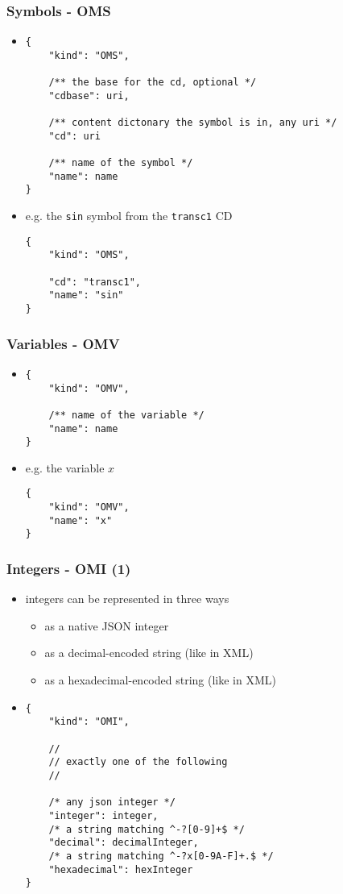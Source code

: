 \documentclass[usenames,dvipsnames]{beamer}
\begin{document}
\begin{frame}[fragile]
    \frametitle{Symbols - OMS}
    \begin{itemize}
        \item
\begin{lstlisting}
{
    "kind": "OMS",

    /** the base for the cd, optional */
    "cdbase": uri, 

    /** content dictonary the symbol is in, any uri */
    "cd": uri

    /** name of the symbol */
    "name": name
}
\end{lstlisting}
        \item e.g. the \texttt{sin} symbol from the \texttt{transc1} CD
\begin{lstlisting}
{
    "kind": "OMS",

    "cd": "transc1",
    "name": "sin"
}
\end{lstlisting}
    \end{itemize}
\end{frame}

\begin{frame}[fragile]
    \frametitle{Variables - OMV}
    \begin{itemize}
        \item
        \begin{lstlisting}
{
    "kind": "OMV",

    /** name of the variable */
    "name": name
}
    \end{lstlisting}
        \item e.g. the variable $x$ \begin{lstlisting}
{
    "kind": "OMV",
    "name": "x"
}
\end{lstlisting}
    \end{itemize}
\end{frame}

\begin{frame}[fragile]
    \frametitle{Integers - OMI (1)}
    \begin{itemize}
        \item integers can be represented in three ways
        \begin{itemize}
            \item as a native JSON integer
            \item as a decimal-encoded string (like in XML)
            \item as a hexadecimal-encoded string (like in XML)
        \end{itemize}
        \item 
\begin{lstlisting}
{
    "kind": "OMI",

    //
    // exactly one of the following
    //

    /* any json integer */
    "integer": integer,
    /* a string matching ^-?[0-9]+$ */
    "decimal": decimalInteger,
    /* a string matching ^-?x[0-9A-F]+.$ */
    "hexadecimal": hexInteger
}
\end{lstlisting}
    \end{itemize}
\end{frame}
\end{document}
